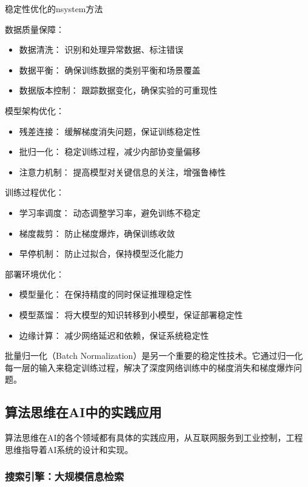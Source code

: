 稳定性优化的nsystem方法

数据质量保障：
\begin{itemize}
\item 数据清洗： 识别和处理异常数据、标注错误
\item 数据平衡： 确保训练数据的类别平衡和场景覆盖
\item 数据版本控制： 跟踪数据变化，确保实验的可重现性
\end{itemize}

模型架构优化：
\begin{itemize}
\item 残差连接： 缓解梯度消失问题，保证训练稳定性
\item 批归一化： 稳定训练过程，减少内部协变量偏移
\item 注意力机制： 提高模型对关键信息的关注，增强鲁棒性
\end{itemize}

训练过程优化：
\begin{itemize}
\item 学习率调度： 动态调整学习率，避免训练不稳定
\item 梯度裁剪： 防止梯度爆炸，确保训练收敛
\item 早停机制： 防止过拟合，保持模型泛化能力
\end{itemize}

部署环境优化：
\begin{itemize}
\item 模型量化： 在保持精度的同时保证推理稳定性
\item 模型蒸馏： 将大模型的知识转移到小模型，保证部署稳定性
\item 边缘计算： 减少网络延迟和依赖，保证系统稳定性
\end{itemize}

批量归一化（Batch Normalization）是另一个重要的稳定性技术。它通过归一化每一层的输入来稳定训练过程，解决了深度网络训练中的梯度消失和梯度爆炸问题。

\subsection{算法思维在AI中的实践应用}

算法思维在AI的各个领域都有具体的实践应用，从互联网服务到工业控制，工程思维指导着AI系统的设计和实现。

\subsubsection{搜索引擎：大规模信息检索}

